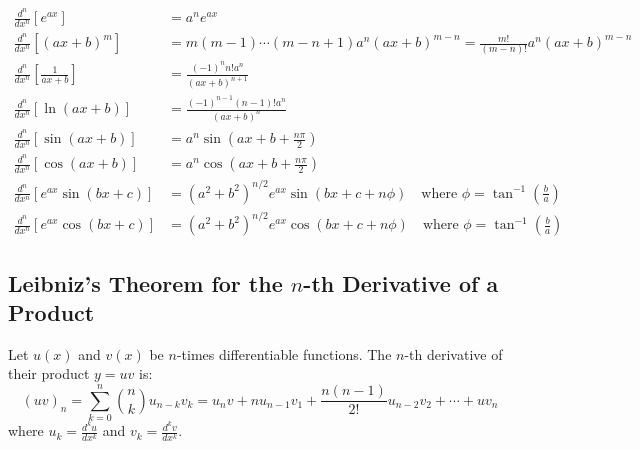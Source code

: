 \begin{keyequation}
\begin{align}
    \frac{d^n}{dx^n}\left[e^{ax}\right] &= a^n e^{ax} \\
    \frac{d^n}{dx^n}\left[(ax+b)^m\right] &= m(m-1)\cdots(m-n+1) a^n (ax+b)^{m-n} = \frac{m!}{(m-n)!} a^n (ax+b)^{m-n} \\
    \frac{d^n}{dx^n}\left[\frac{1}{ax+b}\right] &= \frac{(-1)^n n! a^n}{(ax+b)^{n+1}} \\
    \frac{d^n}{dx^n}\left[\ln(ax+b)\right] &= \frac{(-1)^{n-1} (n-1)! a^n}{(ax+b)^n} \\
    \frac{d^n}{dx^n}\left[\sin(ax+b)\right] &= a^n \sin\left(ax + b + \frac{n\pi}{2}\right) \\
    \frac{d^n}{dx^n}\left[\cos(ax+b)\right] &= a^n \cos\left(ax + b + \frac{n\pi}{2}\right) \\
    \frac{d^n}{dx^n}\left[e^{ax}\sin(bx+c)\right] &= (a^2+b^2)^{n/2} e^{ax} \sin\left(bx + c + n\phi\right) \quad \text{where } \phi = \tan^{-1}\left(\frac{b}{a}\right) \\
    \frac{d^n}{dx^n}\left[e^{ax}\cos(bx+c)\right] &= (a^2+b^2)^{n/2} e^{ax} \cos\left(bx + c + n\phi\right) \quad \text{where } \phi = \tan^{-1}\left(\frac{b}{a}\right)
\end{align}
\end{keyequation}

\subsection{Leibniz's Theorem for the $n$-th Derivative of a Product}

\begin{theorem}
Let $u(x)$ and $v(x)$ be $n$-times differentiable functions. The $n$-th derivative of their product $y = uv$ is:
\begin{equation}
    (uv)_n = \sum_{k=0}^n \binom{n}{k} u_{n-k} v_k = u_n v + n u_{n-1} v_1 + \frac{n(n-1)}{2!} u_{n-2} v_2 + \cdots + u v_n
\end{equation}
where $u_k = \frac{d^k u}{dx^k}$ and $v_k = \frac{d^k v}{dx^k}$.
\end{theorem}

